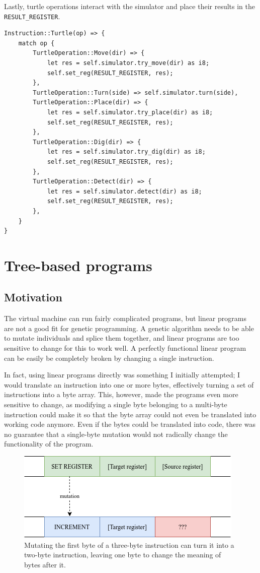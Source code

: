 \documentclass{report}
\begin{document}
Lastly, turtle operations interact with the simulator and place their results in the \verb|RESULT_REGISTER|.

\begin{verbatim}
Instruction::Turtle(op) => {
    match op {
        TurtleOperation::Move(dir) => {
            let res = self.simulator.try_move(dir) as i8;
            self.set_reg(RESULT_REGISTER, res);
        },
        TurtleOperation::Turn(side) => self.simulator.turn(side),
        TurtleOperation::Place(dir) => {
            let res = self.simulator.try_place(dir) as i8;
            self.set_reg(RESULT_REGISTER, res);
        },
        TurtleOperation::Dig(dir) => {
            let res = self.simulator.try_dig(dir) as i8;
            self.set_reg(RESULT_REGISTER, res);
        },
        TurtleOperation::Detect(dir) => {
            let res = self.simulator.detect(dir) as i8;
            self.set_reg(RESULT_REGISTER, res);
        },
    }
}
\end{verbatim}

\section{Tree-based programs}
\subsection{Motivation}
The virtual machine can run fairly complicated programs, but linear programs are not a good fit for genetic programming. A genetic algorithm needs to be able to mutate individuals and splice them together, and linear programs are too sensitive to change for this to work well. A perfectly functional linear program can be easily be completely broken by changing a single instruction.

In fact, using linear programs directly was something I initially attempted; I would translate an instruction into one or more bytes, effectively turning a set of instructions into a byte array. This, however, made the programs even more sensitive to change, as modifying a single byte belonging to a multi-byte instruction could make it so that the byte array could not even be translated into working code anymore. Even if the bytes could be translated into code, there was no guarantee that a single-byte mutation would not radically change the functionality of the program.

\begin{figure}[ht]
    \centering
    \includegraphics[scale=0.75]{binary_mutation}
    \caption{Mutating the first byte of a three-byte instruction can turn it into a two-byte instruction, leaving one byte to change the meaning of bytes after it.}
\end{figure}
\end{document}
